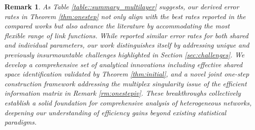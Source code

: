 \documentclass[12pt]{article}
\newtheorem{remark}{Remark}
\begin{document}
 \begin{remark}\label{rm:theorynovel}
 As Table \ref{table::summary_multilayer} suggests, our derived error rates in Theorem \ref{thm:onestep} not only align with the best rates reported in the compared works but also advance the literature by accommodating the most flexible range of link functions. 
 While \cite{he2023semiparametric} reported similar error rates for both shared and individual parameters, 
our work distinguishes itself by 
addressing unique and previously insurmountable challenges  highlighted in Section \ref{sec:challenges}. 
We develop a comprehensive set of  analytical innovations  
including effective shared space identification validated by  Theorem \ref{thm:initial}, and 
a novel joint one-step construction framework addressing the multiplex  
 singularity issue of the efficient  information matrix  in Remark \ref{rm:onestepiv}. 
 These breakthroughs collectively establish a solid foundation for comprehensive analysis of heterogeneous networks, deepening our  understanding of efficiency gains beyond existing statistical paradigms. 
 \end{remark}
\end{document}
